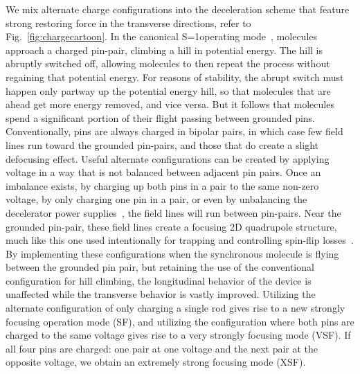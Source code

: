 \documentclass[%
 reprint,
 amsmath,amssymb,
 aps,
prl,
]{revtex4-1}
\newcommand{\s}{{\nobreak\hspace{.2em}}}
\newcommand{\SO}{{S=1}}
\begin{document}
We mix alternate charge configurations into the deceleration scheme that feature strong restoring force in the transverse directions, refer to Fig.~\ref{fig:chargecartoon}.
In the canonical \SO\s operating mode~\cite{VanDeMeerakker2012}, molecules approach a charged pin-pair, climbing a hill in potential energy. 
The hill is abruptly switched off, allowing molecules to then repeat the process without regaining that potential energy.
For reasons of stability, the abrupt switch must happen only partway up the potential energy hill, so that molecules that are ahead get more energy removed, and vice versa. 
But it follows that molecules spend a significant portion of their flight passing between grounded pins.
Conventionally, pins are always charged in bipolar pairs, in which case few field lines run toward the grounded pin-pairs, and those that do create a slight defocusing effect. 
Useful alternate configurations can be created by applying voltage in a way that is not balanced between adjacent pin pairs. 
Once an imbalance exists, by charging up both pins in a pair to the same non-zero voltage, by only charging one pin in a pair, or even by unbalancing the decelerator power supplies~\cite{Hoekstra2018}, the field lines will run between pin-pairs. 
Near the grounded pin-pair, these field lines create a focusing 2D quadrupole structure, much like this one used intentionally for trapping and controlling spin-flip losses~\cite{Reens2017}. 
By implementing these configurations when the synchronous molecule is flying between the grounded pin pair, but retaining the use of the conventional configuration for hill climbing, the longitudinal behavior of the device is unaffected while the transverse behavior is vastly improved.
Utilizing the alternate configuration of only charging a single rod gives rise to a new strongly focusing operation mode (SF), and utilizing the configuration where both pins are charged to the same voltage gives rise to a very strongly focusing mode (VSF). If all four pins are charged: one pair at one voltage and the next pair at the opposite voltage, we obtain an extremely strong focusing mode (XSF).
\end{document}
